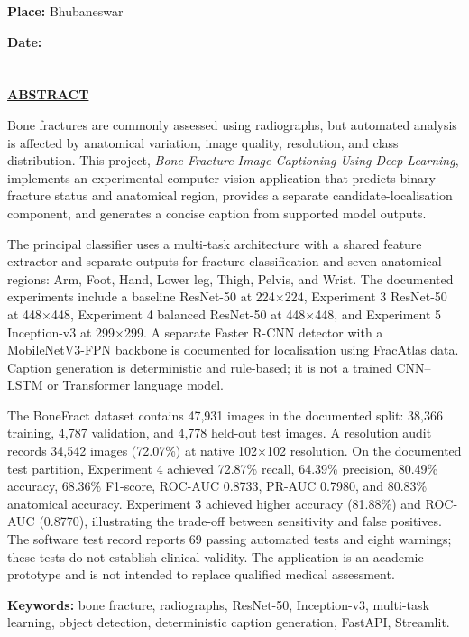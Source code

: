 \documentclass{article}
\begin{document}
\vspace{1.5cm}
\noindent \textbf{Place:} Bhubaneswar\par\vspace{0.3cm}
\noindent \textbf{Date:}

\newpage

\section*{}
\begin{center}
\underline{\LARGE \textbf{ABSTRACT}}\par\vspace{1.0cm}
\end{center}

Bone fractures are commonly assessed using radiographs, but automated analysis is affected by anatomical variation, image quality, resolution, and class distribution. This project, \textit{Bone Fracture Image Captioning Using Deep Learning}, implements an experimental computer-vision application that predicts binary fracture status and anatomical region, provides a separate candidate-localisation component, and generates a concise caption from supported model outputs.

The principal classifier uses a multi-task architecture with a shared feature extractor and separate outputs for fracture classification and seven anatomical regions: Arm, Foot, Hand, Lower leg, Thigh, Pelvis, and Wrist. The documented experiments include a baseline ResNet-50 at 224$\times$224, Experiment 3 ResNet-50 at 448$\times$448, Experiment 4 balanced ResNet-50 at 448$\times$448, and Experiment 5 Inception-v3 at 299$\times$299. A separate Faster R-CNN detector with a MobileNetV3-FPN backbone is documented for localisation using FracAtlas data. Caption generation is deterministic and rule-based; it is not a trained CNN--LSTM or Transformer language model.

The BoneFract dataset contains 47,931 images in the documented split: 38,366 training, 4,787 validation, and 4,778 held-out test images. A resolution audit records 34,542 images (72.07\%) at native 102$\times$102 resolution. On the documented test partition, Experiment 4 achieved 72.87\% recall, 64.39\% precision, 80.49\% accuracy, 68.36\% F1-score, ROC-AUC 0.8733, PR-AUC 0.7980, and 80.83\% anatomical accuracy. Experiment 3 achieved higher accuracy (81.88\%) and ROC-AUC (0.8770), illustrating the trade-off between sensitivity and false positives. The software test record reports 69 passing automated tests and eight warnings; these tests do not establish clinical validity. The application is an academic prototype and is not intended to replace qualified medical assessment.\par\vspace{0.8cm}
\noindent \textbf{Keywords:} bone fracture, radiographs, ResNet-50, Inception-v3, multi-task learning, object detection, deterministic caption generation, FastAPI, Streamlit.
\end{document}
